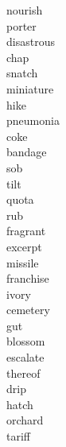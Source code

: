 \documentclass[b5paper, 11pt]{ctexart}
\begin{document}
\begin{multicols*}{3}
\begin{description}
\item[nourish]

\item[porter]

\item[disastrous]

\item[chap]

\item[snatch]

\item[miniature]

\item[hike]

\item[pneumonia]

\item[coke]

\item[bandage]

\item[sob]

\item[tilt]

\item[quota]

\item[rub]

\item[fragrant]

\item[excerpt]

\item[missile]

\item[franchise]

\item[ivory]

\item[cemetery]

\item[gut]

\item[blossom]

\item[escalate]

\item[thereof]

\item[drip]

\item[hatch]

\item[orchard]

\item[tariff]


\end{description}
\end{multicols*}
\end{document}
